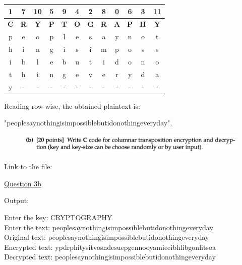 \documentclass{ashoka-crypto}
\begin{document}
\begin{center}
\begin{tabular}{|c|c|c|c|c|c|c|c|c|c|c|c|}
\hline
1          & 7          & 10         & 5          & 9          & 4          & 2          & 8          & 0          & 6          & 3          & 11         \\ \hline
\textbf{C} & \textbf{R} & \textbf{Y} & \textbf{P} & \textbf{T} & \textbf{O} & \textbf{G} & \textbf{R} & \textbf{A} & \textbf{P} & \textbf{H} & \textbf{Y} \\ \hline
p          & e          & o          & p          & l          & e          & s          & a          & y          & n          & o          & t          \\ \hline
h          & i          & n          & g          & i          & s          & i          & m          & p          & o          & s          & s          \\ \hline
i          & b          & l          & e          & b          & u          & t          & i          & d          & o          & n          & o          \\ \hline
t          & h          & i          & n          & g          & e          & v          & e          & r          & y          & d          & a          \\ \hline
y          &     -       &    -        &      -     &     -       &      -      &     -       &     -       &      -      &     -       &       -     &  -          \\ \hline
\end{tabular}
\end{center}

Reading row-wise, the obtained plaintext is:

"peoplesaynothingisimpossiblebutidonothingeveryday".

\clearpage 

\begin{figure}[h]
\includegraphics[width=17cm]{3b}
\end{figure}

Link to the file:

\href{https://drive.google.com/drive/folders/1tfEhPT_h7C7xW9Ym2BqReQu5e4RkwfLP?usp=sharing}{Question 3b}

Output:

Enter the key: CRYPTOGRAPHY\\
Enter the text: peoplesaynothingisimpossiblebutidonothingeveryday\\
Original text: peoplesaynothingisimpossiblebutidonothingeveryday\\
Encrypted text: ypdrphitysitvosndesuepgennooyamieeibhlibgonlitsoa\\
Decrypted text: peoplesaynothingisimpossiblebutidonothingeveryday\\
\end{document}
